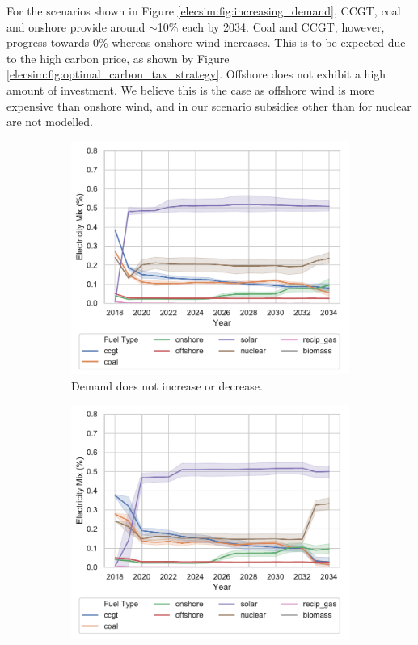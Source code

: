 For the scenarios shown in Figure \ref{elecsim:fig:increasing_demand}, CCGT, coal and onshore provide around ${\sim}$10\% each by 2034.  Coal and CCGT, however, progress towards 0\% whereas onshore wind increases. This is to be expected due to the high carbon price, as shown by Figure \ref{elecsim:fig:optimal_carbon_tax_strategy}. Offshore does not exhibit a high amount of investment. We believe this is the case as offshore wind is more expensive than onshore wind, and in our scenario subsidies other than for nuclear are not modelled.

\begin{figure}
	\centering
	\begin{subfigure}{0.6\textwidth}
		\centering
		\includegraphics[width=\textwidth]{Chapter4/figures/scenarios/representative-day-scenarios/10_demand_mix.pdf}
		\caption{Demand does not increase or decrease.}
		\label{fig:demand10}
	\end{subfigure}
	\hfill
	\begin{subfigure}{0.6\textwidth}  
		\centering 
		\includegraphics[width=\textwidth]{Chapter4/figures/scenarios/representative-day-scenarios/099_demand_mix.pdf}

\end{subfigure}
\end{figure}
